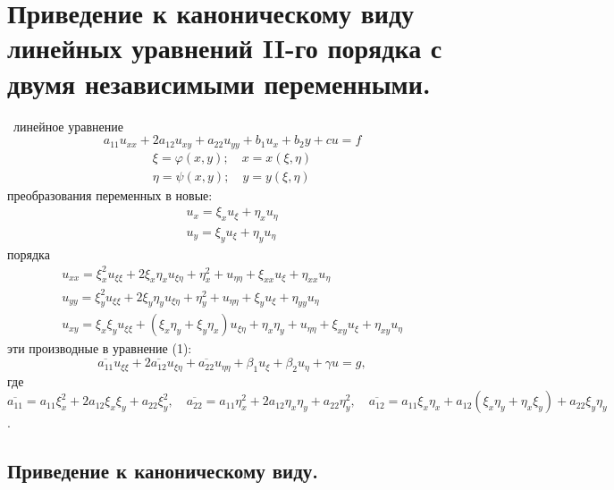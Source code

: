\documentclass[9pt]{article}
\begin{document}
\section{Приведение к каноническому виду линейных уравнений II-го порядка с двумя независимыми переменными.}

\ 
 линейное уравнение
\begin{equation}
    a_{11}u_{xx}+2a_{12}u_{xy}+a_{22}u_{yy}+b_1u_x+b_2y+cu=f
\end{equation}
\begin{align*}
    \xi=\varphi(x,y);\quad x=x(\xi,\eta)\\
    \eta=\psi(x,y);\quad y=y(\xi,\eta)
\end{align*}
 преобразования переменных в новые:
\begin{align*}
    u_x=\xi_xu_\xi+\eta_xu_\eta\\
    u_y=\xi_yu_\xi+\eta_yu_\eta
\end{align*}
 порядка
\begin{align*}
u_{xx}=\xi_x^2u_{\xi\xi}+2\xi_x\eta_xu_{\xi\eta}+\eta^2_x+u_{\eta\eta}+\xi_{xx}u_\xi+\eta_{xx}u_\eta\\
u_{yy}=\xi_y^2u_{\xi\xi}+2\xi_y\eta_yu_{\xi\eta}+\eta^2_y+u_{\eta\eta}+\xi_{y}u_\xi+\eta_{yy}u_\eta\\
u_{xy}=\xi_x\xi_yu_{\xi\xi}+(\xi_x\eta_y+\xi_y\eta_x)u_{\xi\eta}+\eta_x\eta_y+u_{\eta\eta}+\xi_{xy}u_\xi+\eta_{xy}u_\eta
\end{align*}
 эти производные в уравнение (1):
\[
\overline{a_{11}}u_{\xi\xi}+2\overline{a_{12}}u_{\xi\eta}+\overline{a_{22}}u_{\eta\eta}+\beta_1u_\xi+\beta_2u_\eta+\gamma u=g,
\]
где \(\overline{a_{11}}=a_{11}\xi_x^2+2a_{12}\xi_x\xi_y+a_{22}\xi_y^2,\quad\overline{a_{22}}=a_{11}\eta_x^2+2a_{12}\eta_x\eta_y+a_{22}\eta_y^2,\quad\overline{a_{12}}=a_{11}\xi_x\eta_x+a_{12}(\xi_x\eta_y+\eta_x\xi_y)+a_{22}\xi_y\eta_y\).


\subsection{Приведение к каноническому виду.}
\end{document}
